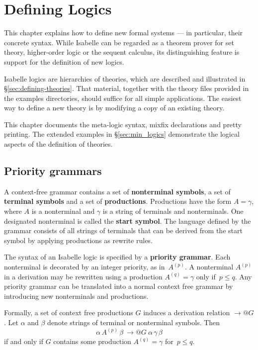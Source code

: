 \chapter{Defining Logics} \label{Defining-Logics}
This chapter explains how to define new formal systems --- in particular,
their concrete syntax.  While Isabelle can be regarded as a theorem prover
for set theory, higher-order logic or the sequent calculus, its
distinguishing feature is support for the definition of new logics.

Isabelle logics are hierarchies of theories, which are described and
illustrated in
%
{\S\ref{sec:defining-theories}}.  That material, together with the theory
files provided in the examples directories, should suffice for all simple
applications.  The easiest way to define a new theory is by modifying a
copy of an existing theory.

This chapter documents the meta-logic syntax, mixfix declarations and
pretty printing.  The extended examples in \S\ref{sec:min_logics}
demonstrate the logical aspects of the definition of theories.


\section{Priority grammars} \label{sec:priority_grammars}

A context-free grammar contains a set of {\bf nonterminal symbols}, a set of
{\bf terminal symbols} and a set of {\bf productions}.
Productions have the form ${A=\gamma}$, where $A$ is a nonterminal and
$\gamma$ is a string of terminals and nonterminals.  One designated
nonterminal is called the {\bf start symbol}.  The language defined by the
grammar consists of all strings of terminals that can be derived from the
start symbol by applying productions as rewrite rules.

The syntax of an Isabelle logic is specified by a {\bf priority
  grammar}. Each nonterminal is decorated by an integer
priority, as in~$A^{(p)}$.  A nonterminal $A^{(p)}$ in a derivation may be
rewritten using a production $A^{(q)} = \gamma$ only if~$p \le q$.  Any
priority grammar can be translated into a normal context free grammar by
introducing new nonterminals and productions.

Formally, a set of context free productions $G$ induces a derivation
relation $\longrightarrow@G$.  Let $\alpha$ and $\beta$ denote strings of
terminal or nonterminal symbols.  Then
\[ \alpha\, A^{(p)}\, \beta ~\longrightarrow@G~ \alpha\,\gamma\,\beta \]
if and only if $G$ contains some production $A^{(q)}=\gamma$ for~$p \le q$.

